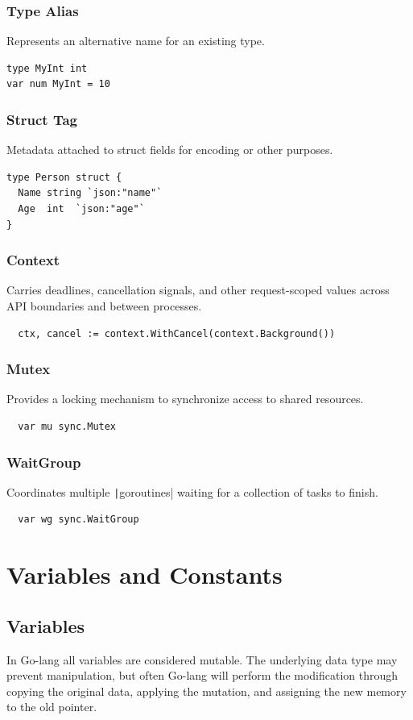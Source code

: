 \documentclass[letterpaper,12pt]{article}
\begin{document}
\subsubsection*{Type Alias}
Represents an alternative name for an existing type.
\begin{verbatim}
type MyInt int
var num MyInt = 10
\end{verbatim}
\subsubsection*{Struct Tag}
Metadata attached to struct fields for encoding or other purposes.
\begin{verbatim}
type Person struct {
  Name string `json:"name"`
  Age  int  `json:"age"`
}
\end{verbatim}
\subsubsection*{Context}
Carries deadlines, cancellation signals, and other request-scoped values across API boundaries and between processes.
\begin{verbatim}
  ctx, cancel := context.WithCancel(context.Background())
\end{verbatim}
\subsubsection*{Mutex}
Provides a locking mechanism to synchronize access to shared resources.
\begin{verbatim}
  var mu sync.Mutex
\end{verbatim}
\subsubsection*{WaitGroup}
Coordinates multiple \texttt|goroutines| waiting for a collection of tasks to finish.
\begin{verbatim}
  var wg sync.WaitGroup
\end{verbatim}

\section{Variables and Constants}

\subsection{Variables}
In Go-lang all variables are considered mutable. The underlying data type may prevent manipulation, but often Go-lang will perform the modification through copying the original data, applying the mutation, and assigning the new memory to the old pointer.
\end{document}
